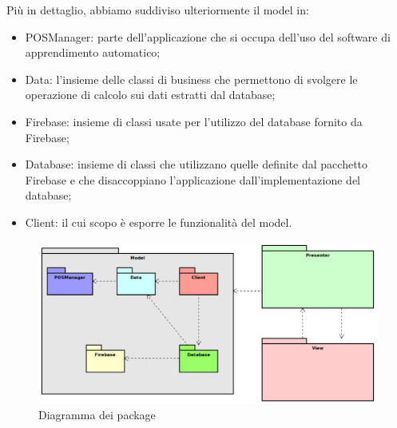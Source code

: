 Più in dettaglio, abbiamo suddiviso ulteriormente il model in:
\begin{itemize}
	\item POSManager: parte dell'applicazione che si occupa dell'uso del software di apprendimento automatico;
	\item Data: l'insieme delle classi di business che permettono di svolgere le operazione di calcolo sui dati estratti dal database;
	\item Firebase: insieme di classi usate per l'utilizzo del database fornito da Firebase;
	\item Database: insieme di classi che utilizzano quelle definite dal pacchetto Firebase e che disaccoppiano l'applicazione dall'implementazione del database;
	\item Client: il cui scopo è esporre le funzionalità del model.
\end{itemize}
\begin{figure}[h]
	\includegraphics[scale=0.5]{images/package.png}
	\caption{Diagramma dei package}
\end{figure}
